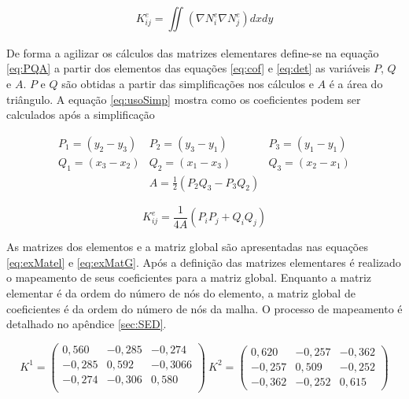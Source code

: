 \documentclass[
    12pt,               %
    openright,          %
    oneside,
    a4paper,            %
    english,            %
    french,             %
    spanish,            %
    brazil              %
    ]{abntex2}
\begin{document}
\begin{apendicesenv}
\begin{equation}
\label{eq:matEl}
K^e_{ij} 
= 
\iint_{}{\left(\nabla N^e_i \nabla N_j^e \right)  dx dy}
\end{equation} 

De forma a agilizar os cálculos das matrizes elementares define-se na equação \ref{eq:PQA}  a partir dos elementos das equações \ref{eq:cof} e \ref{eq:det} as variáveis $P$, $Q$ e $A$. $P$ e $Q$ são obtidas a partir das simplificações nos cálculos e $A$ é a área do triângulo.  A equação \ref{eq:usoSimp} mostra como os coeficientes podem ser calculados após a simplificação

\begin{equation}
\label{eq:PQA}
\begin{matrix}
P_1 = (y_2 - y_3) & P_2 = (y_3 - y_1) & P_3 = (y_1 - y_1) \\
Q_1 = (x_3 - x_2) & Q_2 = (x_1 - x_3) & Q_3 = (x_2 - x_1) \\
\ & A = \frac{1}{2}(P_2Q_3 - P_3Q_2) & \
\end{matrix}
\end{equation}

\begin{equation}
\label{eq:usoSimp}
K^e_{ij} 
= 
\frac{1}{4A}(P_iP_j + Q_iQ_j)
\end{equation}

As matrizes dos elementos e a matriz global são apresentadas nas equações \ref{eq:exMatel} e \ref{eq:exMatG}. Após a definição das matrizes elementares é realizado o mapeamento de seus coeficientes para a matriz global. Enquanto a matriz elementar é da ordem do número de nós do elemento, a matriz global de coeficientes é da ordem do número de nós da malha. O processo de mapeamento é detalhado no apêndice \ref{sec:SED}.

\begin{equation}
\label{eq:exMatel}
K^1 = 
\begin{pmatrix}
0,560 &	-0,285 &	-0,274 \\
-0,285 &	0,592 &	-0,3066\\
-0,274 &	-0,306 &	0,580\\
\end{pmatrix}
\
K^2 =
\begin{pmatrix} 
0,620 &	-0,257 &	-0,362\\
-0,257 &	0,509 &	-0,252\\
-0,362 &	-0,252 &	0,615
\end{pmatrix}
\end{equation}


\end{apendicesenv}
\end{document}

